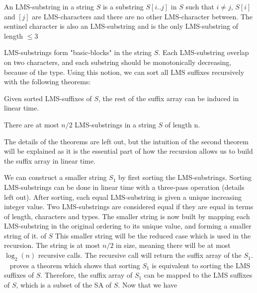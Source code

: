 \begin{definition}

    An LMS-substring in a string $S$ is a substring $S[i..j]$ in $S$ such that $i \neq j$,
    $S[i]$ and $[j]$ are LMS-characters and there are no other LMS-character between. The
    sentinel character is also an LMS-substring and is the only LMS-substring of length
    $\leq 3$

\end{definition}

LMS-substrings form "basic-blocks" in the string $S$. Each LMS-substring overlap on two
characters, and each substring should be monotonically decreasing, because of the type.
Using this notion, we can sort all LMS suffixes recursively with the following theorems:

\begin{theorem}
    Given sorted LMS-suffixes of $S$, the rest of the suffix array can be induced in linear
    time. 
\end{theorem}

\begin{theorem}
    There are at most $n / 2$ LMS-substrings in a string $S$ of length n.
\end{theorem}

The details of the theorems are left out, but the intuition of the second theorem will be
explained as it is the essential part of how the recursion allows us to build the suffix
array in linear time.

We can construct a smaller string $S_1$ by first sorting the LMS-substrings. Sorting
LMS-substrings can be done in linear time with a three-pass operation (details left out).
After sorting, each equal LMS-substring is given a unique increasing integer value. Two
LMS-substrings are considered equal if they are equal in terms of length, characters and
types. The smaller string is now built by mapping each LMS-substring in the original
ordering to its unique value, and forming a smaller string of it. of $S$ This smaller
string will be the reduced case which is used in the recursion. The string is at most $n /
2$ in size, meaning there will be at most $\log_2(n)$ recursive calls. The recursive call
will return the suffix array of the $S_1$. ~\cite{SuffixArrayConstruction} proves a
theorem which shows that sorting $S_1$ is equivalent to sorting the LMS suffixes of $S$.
Therefore, the suffix array of $S_1$ can be mapped to the LMS suffixes of $S$, which is a
subset of the SA of $S$. Now that we have

